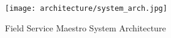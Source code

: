 
\begin{figure}[ht]
	\centering
	\texttt{[image: architecture/system\_arch.jpg]}
	\caption{Field Service Maestro System Architecture}
\end{figure}
